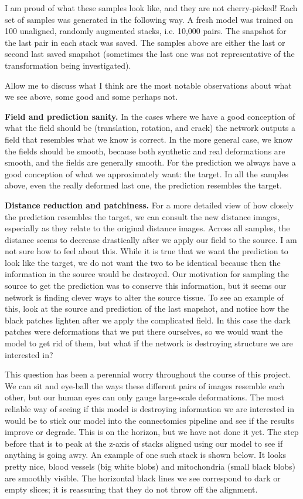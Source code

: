 \documentclass[12pt,a4paper]{article}
\begin{document}
\newpage

I am proud of what these samples look like, and they are not cherry-picked! Each set of samples was generated in the following way. A fresh model was trained on 100 unaligned, randomly augmented stacks, i.e. 10,000 pairs. The snapshot for the last pair in each stack was saved. The samples above are either the last or second last saved snapshot (sometimes the last one was not representative of the transformation being investigated). 

Allow me to discuss what I think are the most notable observations about what we see above, some good and some perhaps not.

{\bf Field and prediction sanity.} In the cases where we have a good conception of what the field should be (translation, rotation, and crack) the network outputs a field that resembles what we know is correct. In the more general case, we know the fields should be smooth, because both synthetic and real deformations are smooth, and the fields are generally smooth. For the prediction we always have a good conception of what we approximately want: the target. In all the samples above, even the really deformed last one, the prediction resembles the target.

{\bf Distance reduction and patchiness. } For a more detailed view of how closely the prediction resembles the target, we can consult the new distance images, especially as they relate to the original distance images. Across all samples, the distance seems to decrease drastically after we apply our field to the source. I am not sure how to feel about this. While it is true that we want the prediction to look like the target, we do not want the two to be identical because then the information in the source would be destroyed. Our motivation for sampling the source to get the prediction was to conserve this information, but it seems our network is finding clever ways to alter the source tissue. To see an example of this, look at the source and prediction of the last snapshot, and notice how the black patches lighten after we apply the complicated field. In this case the dark patches were deformations that we put there ourselves, so we would want the model to get rid of them, but what if the network is destroying structure we are interested in?

This question has been a perennial worry throughout the course of this project. We can sit and eye-ball the ways these different pairs of images resemble each other, but our human eyes can only gauge large-scale deformations. The most reliable way of seeing if this model is destroying information we are interested in would be to stick our model into the connectomics pipeline and see if the results improve or degrade. This is on the horizon, but we have not done it yet. The step before that is to peak at the z-axis of stacks aligned using our model to see if anything is going awry. An example of one such stack is shown below. It looks pretty nice, blood vessels (big white blobs) and mitochondria (small black blobs) are smoothly visible. The horizontal black lines we see correspond to dark or empty slices; it is reassuring that they do not throw off the alignment.
\end{document}
